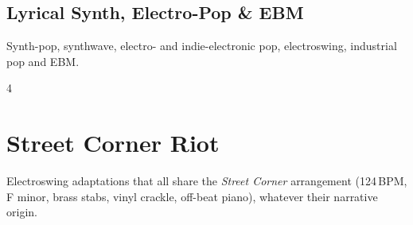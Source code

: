 \documentclass[a4paper,landscape]{memoir}
\begin{document}
\chapter{Lyrical Synth, Electro-Pop \& EBM}
Synth-pop, synthwave, electro- and indie-electronic pop, electroswing, industrial pop and EBM.
\clearpage\begin{multicols*}{4}
\end{multicols*}

\part{Street Corner Riot}
Electroswing adaptations that all share the \emph{Street Corner} arrangement (124\,BPM, F minor, brass stabs, vinyl crackle, off-beat piano), whatever their narrative origin.
\end{document}
